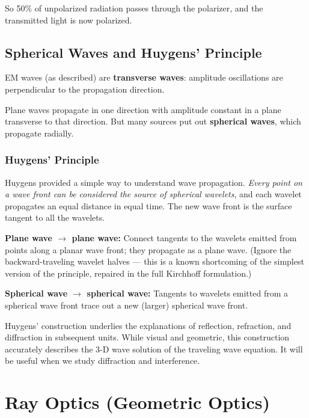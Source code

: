\documentclass[11pt]{report}
\begin{document}
So 50\% of unpolarized radiation passes through the polarizer, and the transmitted light is now polarized.

\section{Spherical Waves and Huygens' Principle}

EM waves (as described) are \textbf{transverse waves}: amplitude oscillations are perpendicular to the propagation direction.

Plane waves propagate in one direction with amplitude constant in a plane transverse to that direction. But many sources put out \textbf{spherical waves}, which propagate radially.

\subsection*{Huygens' Principle}

Huygens provided a simple way to understand wave propagation. \emph{Every point on a wave front can be considered the source of spherical wavelets}, and each wavelet propagates an equal distance in equal time. The new wave front is the surface tangent to all the wavelets.

\textbf{Plane wave $\to$ plane wave:} Connect tangents to the wavelets emitted from points along a planar wave front; they propagate as a plane wave. (Ignore the backward-traveling wavelet halves --- this is a known shortcoming of the simplest version of the principle, repaired in the full Kirchhoff formulation.)

\textbf{Spherical wave $\to$ spherical wave:} Tangents to wavelets emitted from a spherical wave front trace out a new (larger) spherical wave front.

Huygens' construction underlies the explanations of reflection, refraction, and diffraction in subsequent units. While visual and geometric, this construction accurately describes the 3-D wave solution of the traveling wave equation. It will be useful when we study diffraction and interference.


\newpage
\chapter{Ray Optics (Geometric Optics)}
\end{document}
